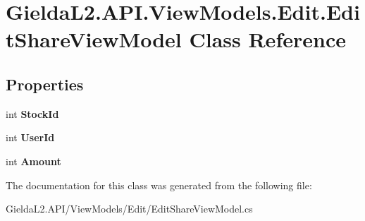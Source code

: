 \hypertarget{class_gielda_l2_1_1_a_p_i_1_1_view_models_1_1_edit_1_1_edit_share_view_model}{}\section{Gielda\+L2.\+A\+P\+I.\+View\+Models.\+Edit.\+Edit\+Share\+View\+Model Class Reference}
\label{class_gielda_l2_1_1_a_p_i_1_1_view_models_1_1_edit_1_1_edit_share_view_model}
\subsection*{Properties}
\begin{DoxyCompactItemize}
\item 
\mbox{\label{class_gielda_l2_1_1_a_p_i_1_1_view_models_1_1_edit_1_1_edit_share_view_model_aa6fd3b3e4f4f0da1db18cbb815496640}} 
int {\bfseries Stock\+Id}
\item 
\mbox{\label{class_gielda_l2_1_1_a_p_i_1_1_view_models_1_1_edit_1_1_edit_share_view_model_a4c883da3027fe288b3498c4734b6dd69}} 
int {\bfseries User\+Id}
\item 
\mbox{\label{class_gielda_l2_1_1_a_p_i_1_1_view_models_1_1_edit_1_1_edit_share_view_model_a682610c18947e80a9cd36b6998c348ac}} 
int {\bfseries Amount}
\end{DoxyCompactItemize}


The documentation for this class was generated from the following file\+:\begin{DoxyCompactItemize}
\item 
Gielda\+L2.\+A\+P\+I/\+View\+Models/\+Edit/Edit\+Share\+View\+Model.\+cs\end{DoxyCompactItemize}
